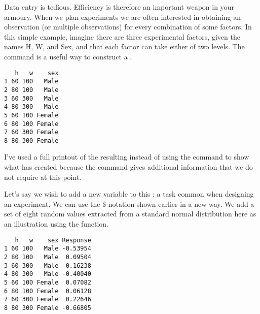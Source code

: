 Data entry is tedious. Efficiency is therefore an important weapon in your armoury. When we plan experiments we are often interested in obtaining an observation (or multiple observations) for every combination of some factors. In this simple example, imagine there are three experimental factors, given the names H, W, and Sex, and that each factor can take either of two levels. The  command is a useful way to construct a . 
\begin{knitrout}
\color{fgcolor}\begin{kframe}
\begin{alltt}
\hlstd{> } \hlkwb{=} \hlstd{(}\hlstd{=}\hlstd{(}\hlstd{,}\hlstd{),} \hlstd{=}\hlstd{(}\hlstd{,} \hlstd{),} \hlstd{=}\hlstd{(}\hlstd{,} \hlstd{))}
\hlstd{> }
\end{alltt}
\begin{verbatim}
   h   w    sex
1 60 100   Male
2 80 100   Male
3 60 300   Male
4 80 300   Male
5 60 100 Female
6 80 100 Female
7 60 300 Female
8 80 300 Female
\end{verbatim}
\end{kframe}
\end{knitrout}
 
I've used a full printout of the resulting  instead of using the  command to show what \R{} has created because the  command gives additional information that we do not require at this point. 
 
Let's say we wish to add a new variable to this ; a task common when designing an experiment. We can use the \$ notation shown earlier in a new way. We add a set of eight random values extracted from a standard normal distribution here as an illustration using the  function. 
\begin{knitrout}
\color{fgcolor}\begin{kframe}
\begin{alltt}
\hlstd{> }\hlopt{$} \hlkwb{=} \hlstd{(}\hlstd{)}
\hlstd{> }
\end{alltt}
\begin{verbatim}
   h   w    sex Response
1 60 100   Male -0.53954
2 80 100   Male  0.09504
3 60 300   Male  0.16238
4 80 300   Male -0.40040
5 60 100 Female  0.07082
6 80 100 Female  0.06128
7 60 300 Female  0.22646
8 80 300 Female -0.66805
\end{verbatim}
\end{kframe}
\end{knitrout}
 
